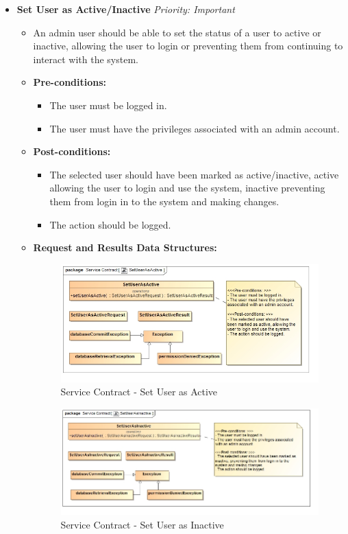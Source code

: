 \documentclass{article}
\begin{document}
\begin{itemize}
					\cleardoublepage
					\item \textbf{Set User as Active/Inactive} \hfill \textit{Priority: Important}
					\begin{itemize}
						\item An admin user should be able to set the status of a user to active or inactive, allowing the user to login or preventing them from continuing to interact with the system.
						\item \textbf{Pre-conditions:}
						\begin{itemize}
							\item The user must be logged in.
							\item The user must have the privileges associated with an admin account.
						\end{itemize}
						\item \textbf{Post-conditions:}
						\begin{itemize}
							\item The selected user should have been marked as active/inactive, active allowing the user to login and use the system, inactive preventing them from login in to the system and making changes.
							\item The action should be logged.
						\end{itemize}
						\item \textbf{Request and Results Data Structures:}
						\begin{figure}[H]
							\includegraphics[width=\linewidth]{../Diagrams/ServiceContracts/User subsystem/SetUserAsActive.jpg}
							\caption{Service Contract - Set User as Active}
						\end{figure}
						\begin{figure}[H]
							\includegraphics[width=\linewidth]{../Diagrams/ServiceContracts/User subsystem/SetUserAsInactive.jpg}
							\caption{Service Contract - Set User as Inactive}
						\end{figure}
					\end{itemize}
					

\end{itemize}
\end{document}
